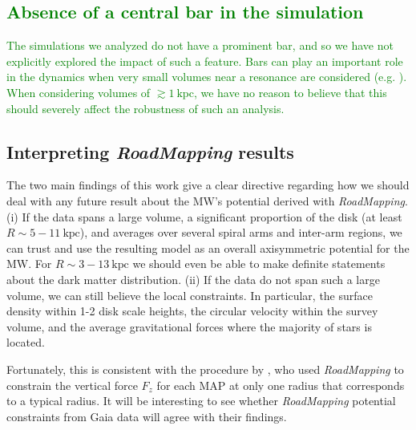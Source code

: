 \documentclass[iop,revtex4,numberedappendix,appendixfloats]{emulateapj}
\newcommand{\RM}{{\sl RoadMapping}}
\newcommand{\NEW}[1]{\textcolor{Green}{#1}}
\newcommand{\OLD}[1]{}
\begin{document}
\OLD{Overall, we expect that the MW spiral arms within a few kiloparsecs around the Sun are weaker than the arms in this galaxy simulation. \citet{2014ApJ...783..130R} measured, for example, that typical peculiar non-circular motions in the MW spiral arms were around $10-20~\text{km s}^{-1}$ for $R \gtrsim 4~\text{kpc}$, while Figure \ref{fig:DF_velres} suggests an excess of stars with radial velocities up to $50~\text{km s}^{-1}$ in our simulated galaxy.}

\subsection{\NEW{Absence of a central bar in the simulation}}

\NEW{The simulations we analyzed do not have a prominent bar, and so we have not explicitly explored the impact of such a feature. Bars can play an important role in the dynamics when very small volumes near a resonance are considered (e.g. \citealt{2000AJ....119..800D}). When considering volumes of $\gtrsim 1~\text{kpc}$, we have no reason to believe that this should severely affect the robustness of such an analysis.}

\subsection{Interpreting \RM{} results}

The two main findings of this work give a clear directive regarding how we should deal with any future result about the MW's potential derived with \RM{}. (i) If the data spans a large volume, a significant proportion of the disk (at least $R\sim 5-11~\text{kpc}$), and averages over several spiral arms and inter-arm regions, we can trust and use the resulting model as an overall axisymmetric potential for the MW. For $R\sim 3-13~\text{kpc}$ we should even be able to make definite statements about the dark matter distribution. (ii) If the data do not span such a large volume, we can still believe the local constraints. In particular, the surface density within 1-2 disk scale heights, the circular velocity within the survey volume, and the average gravitational forces where the majority of stars is located.

Fortunately, this is consistent with the procedure by \citet{2013ApJ...779..115B}, who used \RM{} to constrain the vertical force $F_z$ for each MAP at only one radius that corresponds to a typical radius. It will be interesting to see whether \RM{} potential constraints from Gaia data will agree with their findings.
\end{document}
